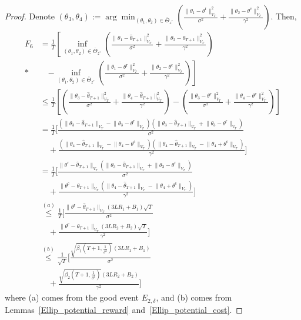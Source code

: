 \documentclass[accepted]{uai2025} %
\theoremstyle{plain}
\theoremstyle{definition}
\theoremstyle{remark}
\newcommand{\thetac}{\theta^{\mathrm{c}}}
\newcommand{\thetar}{\theta^{\mathrm{r}}}
\begin{document}
\begin{proof}
    Denote \( (\theta_3, \theta_4) := \arg\min_{(\theta_1, \theta_2) \in \overline{\Theta}_{z^*}} \left( \frac{\|\theta_1 - \thetar\|_{V_T}^2}{\sigma^2} 
    + \frac{\|\theta_2 - \thetac\|_{V_T}^2}{\gamma^2} \right) \). Then,
    \begin{align*}
        F_6 &= \frac{1}{T} \left[ \inf_{(\theta_1, \theta_2) \in \overline{\Theta}_{z^*}} 
        \left( \frac{\|\theta_1 - \hat{\theta}_{T+1}\|_{V_T}^2}{\sigma^2} + \frac{\|\theta_2 - \hat{\theta}_{T+1}\|_{{V}_T}^2}{\gamma^2} \right) \right. \\*
        &\quad \left. - \inf_{(\theta_1, \theta_2) \in \overline{\Theta}_{z^*}} 
        \left( \frac{\|\theta_1 - \thetar\|_{{V}_T}^2}{\sigma^2} + \frac{\|\theta_2 - \thetac\|_{{V}_T}^2}{\gamma^2} \right) \right] \\
        &\le \frac{1}{T} \left[ \left( \frac{\|\theta_3 - \hat{\theta}_{T+1}\|_{V_T}^2}{\sigma^2} 
        + \frac{\|\theta_4 - \hat{\theta}_{T+1}\|_{{V}_T}^2}{\gamma^2} \right) - \left( \frac{\|\theta_3 - \thetar\|_{{V}_T}^2}{\sigma^2} 
        + \frac{\|\theta_4 - \thetac\|_{{V}_T}^2}{\gamma^2} \right) \right] \\
        &= \frac{1}{T} \Bigg[ \frac{(\lVert \theta_3 - \hat{\theta}_{T+1} \rVert_{V_T} - \lVert \theta_3 - \thetar \rVert_{V_T})(\lVert \theta_3 - \hat{\theta}_{T+1} \rVert_{V_T} + \lVert \theta_3 - \thetar \rVert_{V_T})}{\sigma^2} \\
        &\quad + \frac{(\lVert \theta_4 - \hat{\theta}_{T+1} \rVert_{V_T} - \lVert \theta_4 - \thetac \rVert_{V_T})(\lVert \theta_4 - \hat{\theta}_{T+1} \rVert_{V_T} - \lVert \theta_4 + \thetac \rVert_{V_T})}{\gamma^2} \Bigg] \\
        &= \frac{1}{T} \Bigg[ \frac{\lVert \thetar - \hat{\theta}_{T+1} \rVert_{V_T} (\lVert \theta_3 - \hat{\theta}_{T+1} \rVert_{V_T} + \lVert \theta_3 - \thetar \rVert_{V_T})}{\sigma^2} \\
        &\quad + \frac{\lVert \thetac - \hat{\theta}_{T+1} \rVert_{V_T} (\lVert \theta_4 - \hat{\theta}_{T+1} \rVert_{V_T} - \lVert \theta_4 + \thetac \rVert_{V_T})}{\gamma^2} \Bigg] \\
        &\stackrel{(a)}{\le} \frac{1}{T} \Bigg[ \frac{\lVert \thetar - \hat{\theta}_{T+1} \rVert_{V_T} (3 L R_1 + B_1) \sqrt{T}}{\sigma^2} \\
        &\quad + \frac{\lVert \thetac - \hat{\theta}_{T+1} \rVert_{V_T} (3 L R_2 + B_2) \sqrt{T}}{\gamma^2} \Bigg] \\
        &\stackrel{(b)}{\le} \frac{1}{\sqrt{T}} \Bigg[ \frac{\sqrt{\beta_1(T+1, \frac{1}{\delta^2})}(3 L R_1 + B_1)}{\sigma^2} \\
        &\quad + \frac{\sqrt{\beta_2(T+1, \frac{1}{\delta^2})}(3 L R_2 + B_2)}{\gamma^2} \Bigg]
    \end{align*}
    where (a) comes from the good event \( E_{2, \delta} \), and (b) comes from Lemmas~\ref{Ellip_potential_reward} and~\ref{Ellip_potential_cost}.


\end{proof}
\end{document}
